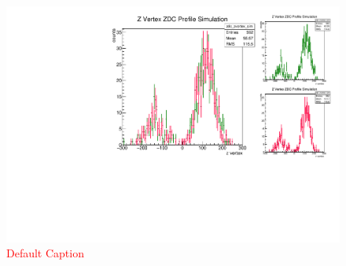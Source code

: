 \begin{figure}
\begin{center}
\includegraphics[width=\linewidth,height=\textheight,keepaspectratio]{./figures/vsigma}
\caption{ \textcolor{red}{Default Caption} }
\label{fig:vsigma}
\end{center}
\end{figure}
